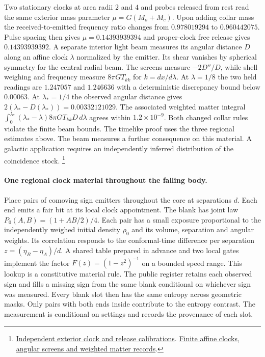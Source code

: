 \documentclass[11pt]{article}
\begin{document}
Two stationary clocks at area radii $2$ and $4$ and probes released from
rest read the same exterior mass parameter $\mu=G(M_o+M_c)$.
Upon adding collar mass the received-to-emitted frequency ratio changes
from $0.978019294$ to $0.960442075$. Pulse spacing then gives
$\mu=0.14393939394$ and proper-clock free release gives $0.14393939392$.
A separate interior light beam measures its angular distance $D$ along
an affine clock $\lambda$ normalized by the emitter. Its shear vanishes
by spherical symmetry for the central radial beam. The screens measure
$-2D''/D$, while shell weighing and frequency measure $8\pi G T_{kk}$
for $k=dx/d\lambda$. At $\lambda=1/8$ the two held readings are
$1.247057$ and $1.246636$ with a deterministic discrepancy bound
below $0.00063$. At $\lambda_*=1/4$ the observed angular distance gives
$2(\lambda_*-D(\lambda_*))=0.00332121029$. The associated weighted
matter integral
$\int_0^{\lambda_*}(\lambda_*-\lambda)8\pi G T_{kk}D\,d\lambda$
agrees within $1.2\times10^{-9}$. Both changed collar rules violate the
finite beam bounds. The timelike proof uses the three regional estimates
above. The beam measures a further consequence on this material.
A galactic application requires an independently inferred distribution
of the coincidence stock.
\footnote{\href{https://github.com/FloatingPragma/observer-patch-holography/blob/main/model/candidate_laws/interval_echo_published_records/spherical_dust/EXTERIOR_READER.md}{Independent exterior clock and release calibrations}.
\href{https://github.com/FloatingPragma/observer-patch-holography/blob/main/model/candidate_laws/interval_echo_published_records/spherical_dust/null_beam.json}{Finite affine clocks, angular screens and weighted matter records}.}

\paragraph{One regional clock material throughout the falling body.}
Place pairs of comoving sign emitters throughout the core at separations
$d$. Each end emits a fair bit at its local clock appointment. The
blank has joint law $P_0(A,B)=(1+AB/2)/4$. Each pair has a small
exposure proportional to the independently weighed initial density
$\rho_0$ and its volume, separation and angular weights. Its
correlation responds to the conformal-time difference per separation
$z=(\eta_B-\eta_A)/d$. A shared table prepared in advance and two
local gates implement the factor $F(z)=(1-z^2)^{-1}$ on a bounded
speed range. This lookup is a constitutive material rule. The public
register retains each observed sign and fills a missing sign from the
same blank conditional on whichever sign was measured. Every blank
slot then has the same entropy across geometric masks. Only pairs
with both ends inside contribute to the entropy contrast. The
measurement is conditional on settings and records the provenance
of each slot.
\end{document}
